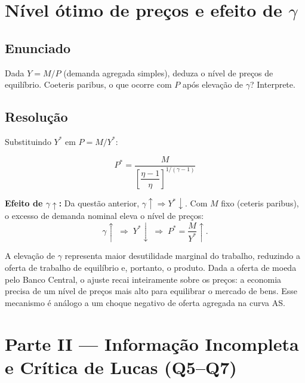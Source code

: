 \documentclass[12pt, a4paper]{article}
\begin{document}
\section{Nível ótimo de preços e efeito de $\gamma$}

\subsection*{Enunciado}
Dada $Y = M/P$ (demanda agregada simples), deduza o nível de preços de equilíbrio.
Coeteris paribus, o que ocorre com $P$ após elevação de $\gamma$? Interprete.

\subsection*{Resolução}

Substituindo $Y^*$ em $P = M/Y^*$:

\begin{resultbox}[title={Nível de preços de equilíbrio}]
\[
\boxed{P^* = \frac{M}{\left[\dfrac{\eta-1}{\eta}\right]^{1/(\gamma-1)}}}
\]
\end{resultbox}

\textbf{Efeito de $\gamma \uparrow$:} Da questão anterior, $\gamma \uparrow \Rightarrow Y^* \downarrow$.
Com $M$ fixo (ceteris paribus), o excesso de demanda nominal eleva o nível de preços:
\[
\gamma \uparrow \;\Rightarrow\; Y^* \downarrow \;\Rightarrow\; P^* = \frac{M}{Y^*} \uparrow.
\]

\begin{provabox}[title={Interpretação estrutural}]
A elevação de $\gamma$ representa maior desutilidade marginal do trabalho, reduzindo
a oferta de trabalho de equilíbrio e, portanto, o produto. Dada a oferta de moeda
pelo Banco Central, o ajuste recai inteiramente sobre os preços: a economia precisa
de um nível de preços mais alto para equilibrar o mercado de bens. Esse mecanismo
é análogo a um choque negativo de oferta agregada na curva AS.
\end{provabox}


\newpage
\section*{\large\color{cyanrbc} Parte II --- Informação Incompleta e Crítica de Lucas (Q5--Q7)}
\end{document}
